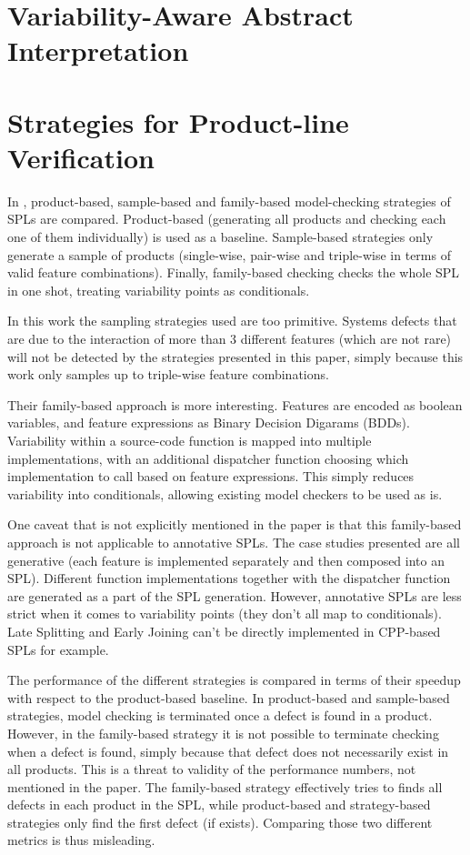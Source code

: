 \documentclass[11pt]{article}
\begin{document}
\section{Variability-Aware Abstract Interpretation}
\cite{Midtgaard:2015}

\section{Strategies for Product-line Verification}

In \cite{Apel:2013}, product-based, sample-based and family-based model-checking strategies of SPLs are compared. Product-based (generating all products and checking each one of them individually) is used as a baseline. Sample-based strategies only generate a sample of products (single-wise, pair-wise and triple-wise in terms of valid feature combinations). Finally, family-based checking checks the whole SPL in one shot, treating variability points as conditionals.

In this work the sampling strategies used are too primitive. Systems defects that are due to the interaction of more than 3 different features (which are not rare) will not be detected by the strategies presented in this paper, simply because this work only samples up to triple-wise feature combinations.

Their family-based approach is more interesting. Features are encoded as boolean variables, and feature expressions as Binary Decision Digarams (BDDs). Variability within a source-code function is mapped into multiple implementations, with an additional dispatcher function choosing which implementation to call based on feature expressions. This simply reduces variability into conditionals, allowing existing model checkers to be used as is.

One caveat that is not explicitly mentioned in the paper is that this family-based approach is not applicable to annotative SPLs. The case studies presented are all generative (each feature is implemented separately and then composed into an SPL). Different function implementations together with the dispatcher function are generated as a part of the SPL generation. However, annotative SPLs are less strict when it comes to variability points (they don't all map to conditionals). Late Splitting and Early Joining can't be directly implemented in CPP-based SPLs for example.

The performance of the different strategies is compared in terms of their speedup with respect to the product-based baseline. In product-based and sample-based strategies, model checking is terminated once a defect is found in a product. However, in the family-based strategy it is not possible to terminate checking when a defect is found, simply because that defect does not necessarily exist in all products. This is a threat to validity of the performance numbers, not mentioned in the paper. The family-based strategy effectively tries to finds all defects in each product in the SPL, while product-based and strategy-based strategies only find the first defect (if exists). Comparing those two different metrics is thus misleading.
\end{document}
